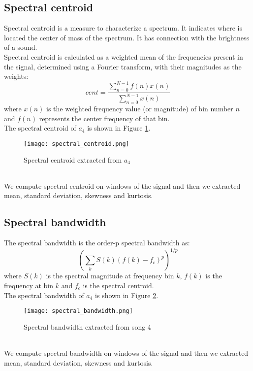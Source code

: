 \subsection{Spectral centroid}
Spectral centroid is a measure to characterize a spectrum. It indicates where is located the center of mass of the spectrum. It has connection with the brightness of a sound.
\\
Spectral centroid is calculated as a weighted mean of the frequencies present in the signal, determined using a Fourier transform, with their magnitudes as the weights:
\begin{equation}
	cent=\dfrac{\sum_{n=0}^{N-1}{f(n)x(n)}}{\sum_{n=0}^{N-1}{x(n)}}
\end{equation}
where $x(n)$ is the weighted frequency value (or magnitude) of bin number $n$ and $f(n)$ represents the center frequency of that bin.
\\
The spectral centroid of $a_4$ is shown in Figure \ref{fig:spectral_centroid}.
\begin{figure}[h]
    \centering
    \texttt{[image: spectral\_centroid.png]} 
	\caption{Spectral centroid extracted from $a_4$}
    \label{fig:spectral_centroid}
\end{figure}
\\
We compute spectral centroid on windows of the signal and then we extracted mean, standard deviation, skewness and kurtosis.

\subsection{Spectral bandwidth}
The spectral bandwidth is the order-p spectral bandwidth as:
\begin{equation}
	{\left(\sum_{k}{S(k){(f(k)-f_c)}^p}\right)}^{1/p}
\end{equation}
where $S(k)$ is the spectral magnitude at frequency bin $k$, $f(k)$ is the frequency at bin $k$ and $f_c$ is the spectral centroid.
\\
The spectral bandwidth of $a_4$ is shown in Figure \ref{fig:spectral_bandwidth}.
\begin{figure}[h]
    \centering
    \texttt{[image: spectral\_bandwidth.png]} 
	\caption{Spectral bandwidth extracted from song 4}
    \label{fig:spectral_bandwidth}
\end{figure}
\\
We compute spectral bandwidth on windows of the signal and then we extracted mean, standard deviation, skewness and kurtosis.

